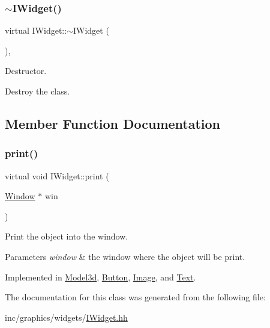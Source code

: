 \subsubsection{\texorpdfstring{$\sim$\+I\+Widget()}{~IWidget()}}
{\footnotesize\ttfamily virtual I\+Widget\+::$\sim$\+I\+Widget (\begin{DoxyParamCaption}{ }\end{DoxyParamCaption})\hspace{0.3cm}{\ttfamily [inline]}, {\ttfamily [virtual]}}



Destructor. 

Destroy the class. 

\subsection{Member Function Documentation}
\mbox{\label{classIWidget_a0cfa49a402e9bb31808a715e048ab2f4}} 
\subsubsection{\texorpdfstring{print()}{print()}}
{\footnotesize\ttfamily virtual void I\+Widget\+::print (\begin{DoxyParamCaption}\item[{\hyperlink{classWindow}{Window} $\ast$}]{win }\end{DoxyParamCaption})\hspace{0.3cm}{\ttfamily [pure virtual]}}



Print the object into the window. 


\begin{DoxyParams}{Parameters}
{\em \textquotesingle{}window\textquotesingle{}} & the window where the object will be print. \\
\hline
\end{DoxyParams}


Implemented in \hyperlink{classModel3d_ae02d86ac82ec9f435cf1ebe668f3a6dd}{Model3d}, \hyperlink{classButton_aaee0c62414711ae91084b05b38d0c8c5}{Button}, \hyperlink{classImage_aca043fb78326d6ce135498419e2d1833}{Image}, and \hyperlink{classText_ab2be08831f604b8a957d540087ba4741}{Text}.



The documentation for this class was generated from the following file\+:\begin{DoxyCompactItemize}
\item 
inc/graphics/widgets/\hyperlink{IWidget_8hh}{I\+Widget.\+hh}\end{DoxyCompactItemize}
